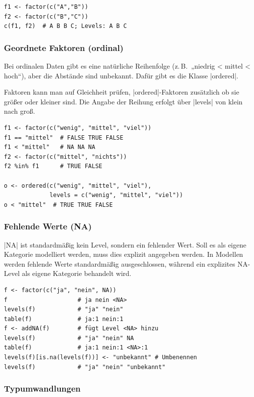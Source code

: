 \documentclass[10pt,twocolumn]{scrartcl}
\renewcommand{\lstinline}{\mycoloredinline}
\begin{document}
\begin{lstlisting}
f1 <- factor(c("A","B"))
f2 <- factor(c("B","C"))
c(f1, f2)  # A B B C; Levels: A B C
\end{lstlisting}


\subsubsection{Geordnete Faktoren (ordinal)}

Bei ordinalen Daten gibt es eine natürliche Reihenfolge (z.\,B.\ „niedrig < mittel < hoch“), aber die Abstände sind unbekannt. Dafür gibt es die Klasse \lstinline|ordered|.

Faktoren kann man auf Gleichheit prüfen, \lstinline|ordered|-Faktoren zusätzlich ob sie größer oder kleiner sind. Die Angabe der Reihung erfolgt über \lstinline|levels| von klein nach groß.

\begin{lstlisting}
f1 <- factor(c("wenig", "mittel", "viel"))
f1 == "mittel"  # FALSE TRUE FALSE
f1 < "mittel"   # NA NA NA
f2 <- factor(c("mittel", "nichts"))
f2 %in% f1      # TRUE FALSE

o <- ordered(c("wenig", "mittel", "viel"),
             levels = c("wenig", "mittel", "viel"))
o < "mittel"  # TRUE TRUE FALSE
\end{lstlisting}


\subsubsection{Fehlende Werte (NA)}

\lstinline|NA| ist standardmäßig kein Level, sondern ein fehlender Wert. Soll es als eigene Kategorie modelliert werden, muss dies explizit angegeben werden. In Modellen werden fehlende Werte standardmäßig ausgeschlossen, während ein explizites NA-Level als eigene Kategorie behandelt wird.

\begin{lstlisting}
f <- factor(c("ja", "nein", NA))
f                    # ja nein <NA>
levels(f)            # "ja" "nein"
table(f)             # ja:1 nein:1
f <- addNA(f)        # fügt Level <NA> hinzu
levels(f)            # "ja" "nein" NA
table(f)             # ja:1 nein:1 <NA>:1
levels(f)[is.na(levels(f))] <- "unbekannt" # Umbenennen
levels(f)            # "ja" "nein" "unbekannt"
\end{lstlisting}


\subsubsection{Typumwandlungen}
\end{document}
